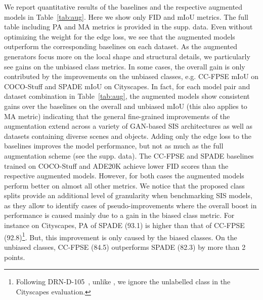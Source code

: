 \documentclass[final]{cvpr}
\newcommand\+{\mkern4mu}
\begin{document}
We report quantitative results of the baselines and the respective augmented models in Table~\ref{tab:aug}. Here we show only FID and mIoU metrics. The full table including PA and MA metrics is provided in the supp. data. Even without optimizing the weight for the edge loss, we see that the augmented models outperform the corresponding baselines on each dataset. As the augmented generators focus more on the local shape and structural details, we particularly see gains on the unbiased class metrics. In some cases, the overall gain is only contributed by the improvements on the unbiased classes, e.g. CC-FPSE mIoU on COCO-Stuff and SPADE mIoU on Cityscapes. In fact, for each model pair and dataset combination in Table~\ref{tab:aug}, the augmented models show consistent gains over the baselines on the overall and unbiased mIoU (this also applies to MA metric) indicating that the general fine-grained improvements of the augmentation extend across a variety of GAN-based SIS architectures as well as datasets containing diverse scenes and objects. Adding only the edge loss to the baselines improves the model performance, but not as much as the full augmentation scheme (see the supp. data). The CC-FPSE and SPADE baselines trained on COCO-Stuff and ADE20K achieve lower FID scores than the respective augmented models. However, for both cases the augmented models perform better on almost all other metrics. We notice that the proposed class splits provide an additional level of granularity when benchmarking SIS models, as they allow to identify cases of pseudo-improvements where the overall boost in performance is caused mainly due to a gain in the biased class metric. For instance on Cityscapes, PA of SPADE (93.1) is higher than that of CC-FPSE (92.8)\footnote{Following DRN-D-105~\cite{drn105}, unlike \cite{park2019semantic,liu2019learning}, we ignore the unlabelled class in the Cityscapes evaluation.}. But, this improvement is only caused by the biased classes. On the unbiased classes, CC-FPSE (84.5) outperforms SPADE (82.3) by more than 2 points.
\end{document}
